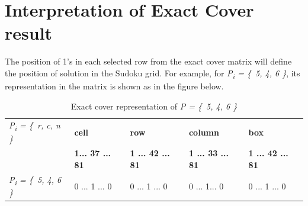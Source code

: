 \documentclass[a4paper,oneside,11pt]{report}
\newcounter{row}
\newcounter{col}
\begin{document}
\section{Interpretation of Exact Cover result}
The position of 1’s in each selected row from the exact cover matrix will define the position of solution in the Sudoku grid. For example, for {\itshape P\textsubscript{i} = \{\ 5, 4, 6 \}}, its representation in the matrix is shown as  in the figure below.
\begin{table}[!ht]
\begin{tabular}{m{2.5cm} m{3cm} m{3cm} m{3cm} m{3cm}}
{\itshape P\textsubscript{i} = \{\ r, c, n \}} & \textbf{cell} & \textbf{row} & \textbf{column} & \textbf{box}\\ 
& \textbf{1\hspace{0.1cm}...\hspace{0.1cm} 37 \hspace{0.1cm}... \hspace{0.1cm}	81} & \textbf{1\hspace{0.3cm} ...\hspace{0.3cm} 42 \hspace{0.1cm}... \hspace{0.1cm}	81} & \textbf{1\hspace{0.3cm} ...\hspace{0.3cm} 33 \hspace{0.1cm}... \hspace{0.1cm}	81} & \textbf{1\hspace{0.3cm} ...\hspace{0.3cm} 42 \hspace{0.1cm}... \hspace{0.1cm}	81}\\ 
{\itshape P\textsubscript{i} = \{\ 5, 4, 6 \}} & 0\hspace{0.1cm} ...\hspace{0.1cm} 1 \hspace{0.2cm}... \hspace{0.1cm}	0 & 0 \hspace{0.3cm} ...\hspace{0.3cm} 1 \hspace{0.1cm}... \hspace{0.1cm}	0 & 0\hspace{0.3cm} ...\hspace{0.5cm} 1\hspace{0.3cm}... \hspace{0.2cm}	0 & 0\hspace{0.3cm} ...\hspace{0.3cm} 1 \hspace{0.3cm}... \hspace{0.1cm}	0\\ 
\end{tabular}
\caption{{Exact cover representation of {\itshape P = \{\ 5, 4, 6 \}}}}
\end{table}
\end{document}
